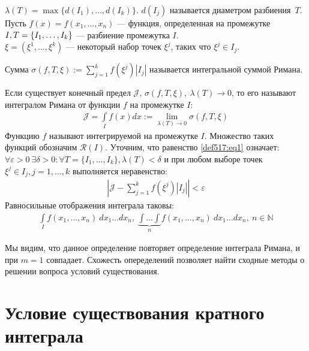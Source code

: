 \begin{definition}
  $\lambda(T) = \max\{d(I_1), \dots, d(I_k)\}$.
  $d(I_j)$ называется диаметром разбиения~$T$. Пусть $f(x) = f(x_1, \dots,
  x_n)$ --- функция, определенная на промежутке $I, \\ T = \{I_1, \dots, I_k\}$
  --- разбиение промежутка $I$. \\
  $\xi = (\xi^1, \dots, \xi^k)$ --- некоторый набор точек $\xi^j$, таких что
  $\xi^j \in I_j$.
\end{definition}

\begin{definition}
  Сумма $\sigma(f, T, \xi) := \sum\limits_{j = 1}^k f(\xi^j)|I_j|$ называется
  интегральной суммой Римана.
\end{definition}

\begin{definition}
  Если существует конечный предел $\mathcal{J}$, $\sigma(f, T, \xi), \
  \lambda(T) \to 0$, то его называют интегралом Римана от функции $f$ на
  промежутке $I$:
  \begin{gather}
    \mathcal{J} = \int\limits_I f(x) dx := \lim\limits_{\lambda(T) \to 0}
    \sigma(f, T, \xi)
    \label{def517:eq1}
  \end{gather}
  Функцию $f$ называют интегрируемой на промежутке $I$. Множество таких функций
  обозначим $\mathcal{R}(I)$. Уточним, что равенство \eqref{def517:eq1}
  означает:
  $\forall \varepsilon > 0 \ \exists \delta > 0 : \forall T = \{I_1, \dots,
  I_k\}, \lambda(T) < \delta$ и при любом выборе точек $\xi^j \in I_j, j = 1,
  \dots, k$ выполняется неравенство:
  \begin{gather*}
    \left|\mathcal{J} - \sum\limits_{j = 1}^{k} f(\xi^j) |I_j|\right| <
    \varepsilon
  \end{gather*}
  Равносильные отображения интеграла таковы:
  \begin{gather*}
    \int\limits_I f(x_1, \dots, x_n) \ dx_1 \dots dx_n, \
    \underset{n}{\underbrace{\int \dots \int}} f(x_1, \dots, x_n) \ dx_1 \dots
    dx_n, \ n \in \mathbb{N}
  \end{gather*}
\end{definition}

Мы видим, что данное определение повторяет определение интеграла Римана, и при
$m = 1$ совпадает. Схожесть опеределений позволяет найти сходные методы о
решении вопроса условий существования.

\section{Условие существования кратного интеграла}

